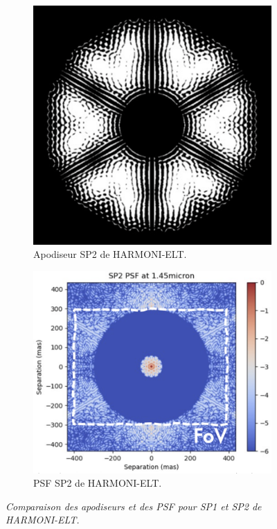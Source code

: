 \begin{figure}[htbp]
    \begin{subfigure}[b]{0.40\textwidth}
        \centering
        \includegraphics[width=\textwidth]{figures/SP2_HARMONI.png}
        \caption{Apodiseur SP2 de HARMONI-ELT.}
    \end{subfigure}
    \hfill %
    \begin{subfigure}[b]{0.45\textwidth}
        \centering
        \includegraphics[width=\textwidth]{figures/PSF_SP2_HARMONI.png}
        \caption{PSF SP2 de HARMONI-ELT.}
    \end{subfigure}
    
    \caption{\textit{Comparaison des apodiseurs et des PSF pour SP1 et SP2 de HARMONI-ELT.}}
\end{figure}

